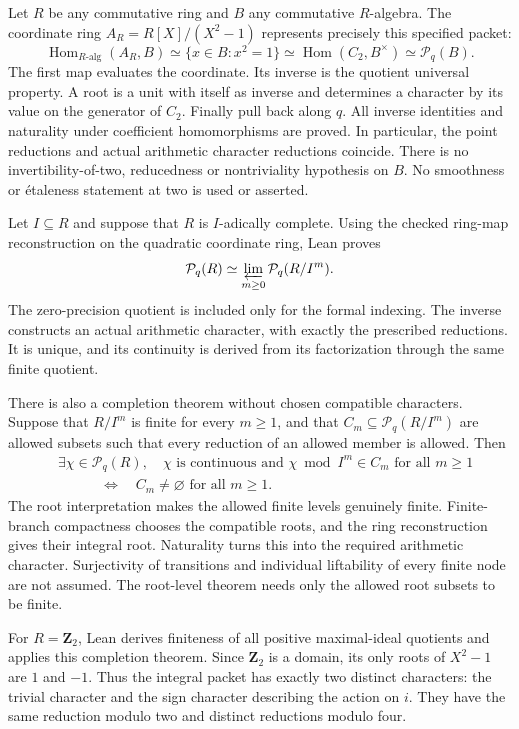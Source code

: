 \documentclass[11pt]{article}
\theoremstyle{definition}
\theoremstyle{remark}
\newcommand{\Z}{\mathbf Z}
\newcommand{\Hom}{\operatorname{Hom}}
\begin{document}
Let $R$ be any commutative ring and $B$ any commutative $R$-algebra. The
coordinate ring $A_R=R[X]/(X^2-1)$ represents precisely this specified
packet:
\[
\Hom_{R\text{-alg}}(A_R,B)
\simeq\{x\in B:x^2=1\}
\simeq\Hom(C_2,B^\times)
\simeq\mathcal P_q(B).
\]
The first map evaluates the coordinate. Its inverse is the quotient
universal property. A root is a unit with itself as inverse and determines
a character by its value on the generator of $C_2$. Finally pull back
along $q$. All inverse identities and naturality under coefficient
homomorphisms are proved. In particular, the point reductions and actual
arithmetic character reductions coincide. There is no invertibility-of-two,
reducedness or nontriviality hypothesis on $B$. No smoothness or
\'{e}taleness statement at two is used or asserted.

Let $I\subseteq R$ and suppose that $R$ is $I$-adically complete. Using
the checked ring-map reconstruction on the quadratic coordinate ring,
Lean proves
\[
\mathcal P_q(R)\simeq\varprojlim_{m\ge0}\mathcal P_q(R/I^m).
\]
The zero-precision quotient is included only for the formal indexing.
The inverse constructs an actual arithmetic character, with exactly the
prescribed reductions. It is unique, and its continuity is derived from
its factorization through the same finite quotient.

There is also a completion theorem without chosen compatible characters.
Suppose that $R/I^m$ is finite for every $m\ge1$, and that
$C_m\subseteq\mathcal P_q(R/I^m)$ are allowed subsets such that every
reduction of an allowed member is allowed. Then
\[
\begin{split}
&\exists\chi\in\mathcal P_q(R),\quad
  \chi\text{ is continuous and }\chi\bmod I^m\in C_m
  \text{ for all }m\ge1\\
&\hspace{3em}\Longleftrightarrow\quad
  C_m\ne\varnothing\text{ for all }m\ge1.
\end{split}
\]
The root interpretation makes the allowed finite levels genuinely finite.
Finite-branch compactness chooses the compatible roots, and the ring
reconstruction gives their integral root. Naturality turns this into the
required arithmetic character. Surjectivity of transitions and individual
liftability of every finite node are not assumed. The root-level theorem
needs only the allowed root subsets to be finite.

For $R=\Z_2$, Lean derives finiteness of all positive maximal-ideal
quotients and applies this completion theorem. Since $\Z_2$ is a domain,
its only roots of $X^2-1$ are $1$ and $-1$. Thus the integral packet has
exactly two distinct characters: the trivial character and the sign
character describing the action on $i$. They have the same reduction
modulo two and distinct reductions modulo four.
\end{document}
